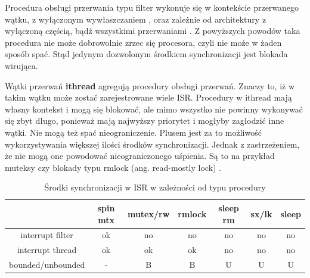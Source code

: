 \documentclass[shortabstract,inz]{iithesis}
\begin{document}
Procedura obsługi przerwania typu filter wykonuje się w kontekście przerwanego 
wątku, z wyłączonym wywłaszczaniem \cite{man:critical_enter_9},
oraz zależnie od architektury z wyłączoną częścią,
bądź wszystkimi przerwaniami \cite{mips_intr_code}\cite{mips_exception}.
Z powyższych powodów taka procedura nie może dobrowolnie zrzec się procesora, 
czyli nie może w żaden sposób spać.
Stąd jedynym dozwolonym środkiem synchronizacji jest blokada wirująca.

Wątki przerwań \textbf{ithread} agregują procedury obsługi przerwań. 
Znaczy to, iż w takim wątku może zostać zarejestrowane wiele ISR.
Procedury w ithread mają własny kontekst i mogą się blokować, ale mimo wszystko nie powinny wykonywać
się zbyt długo, ponieważ mają najwyższy priorytet
i mogłyby zagłodzić inne wątki. 
Nie mogą też spać nieograniczenie. 
Plusem jest za to możliwość wykorzystywania większej ilości środków synchronizacji.
Jednak z zastrzeżeniem, że nie mogą one powodować nieograniczonego uśpienia.
Są to na przykład muteksy czy blokady typu rmlock (ang. read-mostly lock) \cite{man:locking_9}.






\begin{table}
\begin{center}
\caption{Środki synchronizacji w ISR w zależności od typu procedury}
\begin{tabular}{|c|c|c|c|c|c|c|}
\hline
                 & spin mtx & mutex/rw & rmlock & sleep rm & sx/lk & sleep  \\ \hline
interrupt filter & ok       & no       & no     & no       & no    & no \\ \hline
interrupt thread & ok       & ok       & ok     & no       & no    & no \\ \hline
bounded/unbounded & -       & B       & B     & U       & U    & U \\ 
\hline
\end{tabular}
\end{center}
\end{table}
\end{document}

